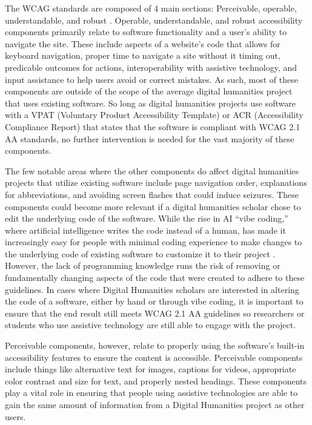 \documentclass[final]{anthology-ch}
\begin{document}
The WCAG standards are composed of 4 main sections: Perceivable, operable, understandable, and robust \cite{w3c2025wcag}. Operable, understandable, and robust accessibility components primarily relate to software functionality and a user's ability to navigate the site. These include aspects of a website's code that allows for keyboard navigation, proper time to navigate a site without it timing out, predicable outcomes for actions, interoperability with assistive technology, and input assistance to help users avoid or correct mistakes. As such, most of these components are outside of the scope of the average digital humanities project that uses existing software. So long as digital humanities projects use software with a VPAT (Voluntary Product Accessibility Template) or ACR (Accessibility Compliance Report) that states that the software is compliant with WCAG 2.1 AA standards, no further intervention is needed for the vast majority of these components.

The few notable areas where the other components do affect digital humanities projects that utilize existing software include page navigation order, explanations for abbreviations, and avoiding screen flashes that could induce seizures. These components could become more relevant if a digital humanities scholar chose to edit the underlying code of the software. While the rise in AI \enquote{vibe coding,} where artificial intelligence writes the code instead of a human, has made it increasingly easy for people with minimal coding experience to make changes to the underlying code of existing software to customize it to their project \cite{williams2025vibe}. However, the lack of programming knowledge runs the risk of removing or fundamentally changing aspects of the code that were created to adhere to these guidelines. In cases where Digital Humanities scholars are interested in altering the code of a software, either by hand or through vibe coding, it is important to ensure that the end result still meets WCAG 2.1 AA guidelines so researchers or students who use assistive technology are still able to engage with the project.

Perceivable components, however, relate to properly using the software's built-in accessibility features to ensure the content is accessible. Perceivable components include things like alternative text for images, captions for videos, appropriate color contrast and size for text, and properly nested headings. These components play a vital role in ensuring that people using assistive technologies are able to gain the same amount of information from a Digital Humanities project as other users.
\end{document}
